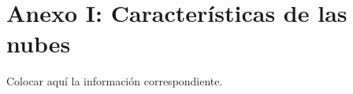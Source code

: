 \appendix{}
\renewcommand{\appendixname}{Anexos}
\renewcommand{\appendixtocname}{Anexos}
\renewcommand{\appendixpagename}{Anexos}
\clearpage
\addappheadtotoc
\appendixpage


\chapter{Anexo I: Características de las nubes}
\label{anexoI}

Colocar aquí la información correspondiente.




